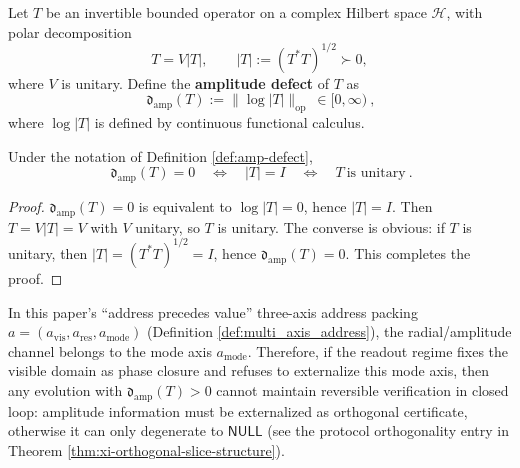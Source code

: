 \begin{definition}\label{def:amp-defect}
Let \(T\) be an invertible bounded operator on a complex Hilbert space \(\mathcal H\), with polar decomposition
\[
T=V|T|,\qquad |T|:=(T^\ast T)^{1/2}\succ 0,
\]
where \(V\) is unitary.
Define the \textbf{amplitude defect} of \(T\) as
\[
\boxed{\ \mathfrak{d}_{\mathrm{amp}}(T):=\bigl\|\log|T|\bigr\|_{\mathrm{op}}\ \in[0,\infty)\ },
\]
where \(\log|T|\) is defined by continuous functional calculus.
\end{definition}

\begin{proposition}\label{prop:amp-defect-unitary}
Under the notation of Definition \ref{def:amp-defect},
\[
\boxed{\ \mathfrak{d}_{\mathrm{amp}}(T)=0\quad\Longleftrightarrow\quad |T|=I\quad\Longleftrightarrow\quad T\ \text{is unitary}\ }.
\]
\end{proposition}
\begin{proof}
\(\mathfrak{d}_{\mathrm{amp}}(T)=0\) is equivalent to \(\log|T|=0\), hence \(|T|=I\).
Then \(T=V|T|=V\) with \(V\) unitary, so \(T\) is unitary.
The converse is obvious: if \(T\) is unitary, then \(|T|=(T^\ast T)^{1/2}=I\), hence \(\mathfrak{d}_{\mathrm{amp}}(T)=0\).
This completes the proof.
\end{proof}

\begin{remark}\label{rem:amp-defect-address-axis}
In this paper's ``address precedes value'' three-axis address packing \(a=(a_{\mathrm{vis}},a_{\mathrm{res}},a_{\mathrm{mode}})\) (Definition \ref{def:multi_axis_address}), the radial/amplitude channel belongs to the mode axis \(a_{\mathrm{mode}}\).
Therefore, if the readout regime fixes the visible domain as phase closure and refuses to externalize this mode axis, then any evolution with \(\mathfrak{d}_{\mathrm{amp}}(T)>0\) cannot maintain reversible verification in closed loop: amplitude information must be externalized as orthogonal certificate, otherwise it can only degenerate to \(\mathsf{NULL}\) (see the protocol orthogonality entry in Theorem \ref{thm:xi-orthogonal-slice-structure}).
\end{remark}

